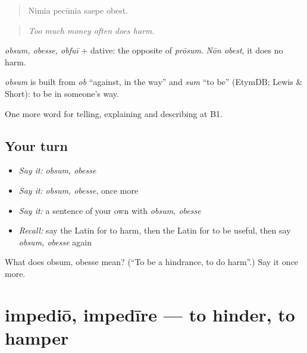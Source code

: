 \begin{quote}
Nimia pecūnia saepe obest.
\end{quote}

\begin{quote}
\emph{Too much money often does harm.}
\end{quote}

\emph{obsum, obesse, obfuī} + dative: the opposite of \emph{prōsum}. \emph{Nōn obest}, it does no harm.

\begin{cousinweb}
\emph{obsum} is built from \emph{ob} \textquotedblleft{}against, in the way\textquotedblright{} and \emph{sum} \textquotedblleft{}to be\textquotedblright{} (EtymDB; Lewis \& Short): to be in someone's way.
\end{cousinweb}

\begin{grammarlens}[title={What you've built}]
One more word for telling, explaining and describing at B1.
\end{grammarlens}

\subsection*{Your turn}
\begin{itemize}
\raggedright
  \item \emph{Say it:} \emph{obsum, obesse}
  \item \emph{Say it:} \emph{obsum, obesse}, once more
  \item \emph{Say it:} a sentence of your own with \emph{obsum, obesse}
  \item \emph{Recall:} say the Latin for to harm, then the Latin for to be useful, then say \emph{obsum, obesse} again
\end{itemize}

\begin{tcolorbox}[breakable,colback=teal!4,colframe=teal!35!black,title={Before you move on}]
What does obsum, obesse mean? (\textquotedblleft{}To be a hindrance, to do harm\textquotedblright{}.) Say it once more.
\end{tcolorbox}
\section[impediō, impedīre]{impediō, impedīre — to hinder, to hamper}

\label{lesson:LA-C374-impedio}



